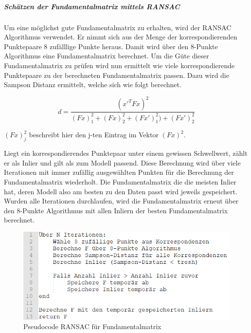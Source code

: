 \subparagraph{Schätzen der Fundamentalmatrix mittels RANSAC}
Um eine möglichst gute Fundamentalmatrix zu erhalten, wird der RANSAC Algorithmus verwendet. Er nimmt sich aus der Menge der korrespondierenden Punktepaare 8 zufälllige Punkte heraus. Damit wird über den 8-Punkte Algorithmus eine Fundamentalmatrix berechnet. Um die Güte dieser Fundamentalmatrix zu prüfen wird nun ermittelt wie viele korrespondierende Punktepaare zu der berechneten Fundamentalmatrix passen. Dazu wird die Sampson Distanz ermittelt, welche sich wie folgt berechnet.

$$d =  \dfrac{(x'^TFx)^2}{(Fx)^2_1 + (Fx)^2_2 + (Fx')^2_1) + (Fx')^2_2}$$

$(Fx)^2_j$ beschreibt hier den j-ten Eintrag im Vektor $(Fx)^2$.

Liegt ein korrespondierendes Punktepaar unter einem gewissen Schwellwert, zählt er als Inlier und gilt als zum Modell passend. Diese Berechnung wird über viele Iterationen mit immer zufällig ausgewählten Punkten für die Berechnung der Fundamentalmatrix wiederholt. Die Fundamentalmatrix die die meisten Inlier hat, deren Modell also am besten zu den Daten passt wird jeweils gespeichert. Wurden alle Iterationen durchlaufen, wird die Fundamentalmatrix erneut über den 8-Punkte Algorithmus mit allen Inliern der besten Fundamentalmatrix berechnet. \cite{Richard2000} \cite{Mathworksb}

\begin{figure}[ht]
    \centering
    \includegraphics[scale=0.75]{Figures/PseudocodeRansac.PNG}
    \caption{Pseudocode RANSAC für Fundamentalmatrix}
\end{figure}

